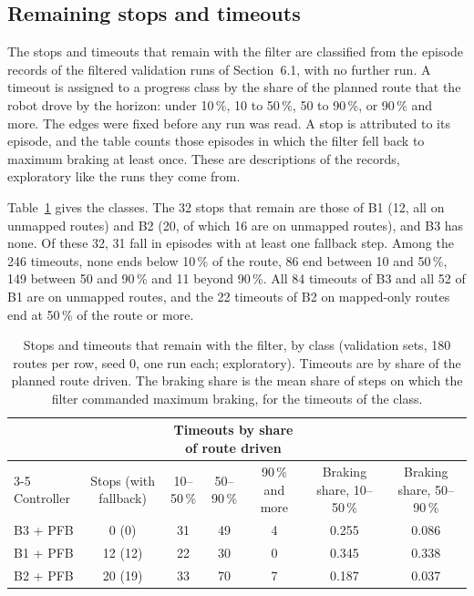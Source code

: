 \subsection{Remaining stops and timeouts}

The stops and timeouts that remain with the filter are classified from the episode records of the filtered validation runs of Section~6.1, with no further run. A timeout is assigned to a progress class by the share of the planned route that the robot drove by the horizon: under 10\,\%, 10 to 50\,\%, 50 to 90\,\%, or 90\,\% and more. The edges were fixed before any run was read. A stop is attributed to its episode, and the table counts those episodes in which the filter fell back to maximum braking at least once. These are descriptions of the records, exploratory like the runs they come from.

Table~\ref{tab:remaining} gives the classes. The 32 stops that remain are those of B1 (12, all on unmapped routes) and B2 (20, of which 16 are on unmapped routes), and B3 has none. Of these 32, 31 fall in episodes with at least one fallback step. Among the 246 timeouts, none ends below 10\,\% of the route, 86 end between 10 and 50\,\%, 149 between 50 and 90\,\% and 11 beyond 90\,\%. All 84 timeouts of B3 and all 52 of B1 are on unmapped routes, and the 22 timeouts of B2 on mapped-only routes end at 50\,\% of the route or more.

\begin{table}[t]
\caption{Stops and timeouts that remain with the filter, by class (validation sets, 180 routes per row, seed 0, one run each; exploratory). Timeouts are by share of the planned route driven. The braking share is the mean share of steps on which the filter commanded maximum braking, for the timeouts of the class.}
\label{tab:remaining}
\centering
\small
\setlength{\tabcolsep}{4pt}
\begin{tabular}{lcccccc}
\toprule
 & & \multicolumn{3}{c}{Timeouts by share of route driven} & & \\
\cmidrule(lr){3-5}
Controller & Stops (with fallback) & 10--50\,\% & 50--90\,\% & 90\,\% and more & Braking share, 10--50\,\% & Braking share, 50--90\,\% \\
\midrule
B3 + PFB & 0 (0) & 31 & 49 & 4 & 0.255 & 0.086 \\
B1 + PFB & 12 (12) & 22 & 30 & 0 & 0.345 & 0.338 \\
B2 + PFB & 20 (19) & 33 & 70 & 7 & 0.187 & 0.037 \\
\bottomrule
\end{tabular}
\end{table}

